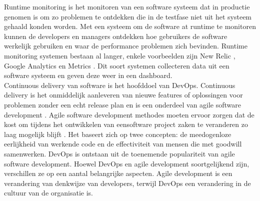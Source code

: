 Runtime monitoring is het monitoren van een software systeem dat in productie genomen is om zo problemen te ontdekken die in de testfase niet uit het systeem gehaald konden worden. Met een systeem om de software at runtime te monitoren kunnen de developers en managers ontdekken hoe gebruikers de software werkelijk gebruiken en waar de performance problemen zich bevinden. Runtime monitoring systemen bestaan al langer, enkele voorbeelden zijn New Relic \cite{NewRelic}, Google Analytics \cite{GooAna} en Metrics \cite{Metrics}. Dit soort systemen collecteren data uit een software systeem en geven deze weer in een dashboard. \\

Continuous delivery van software is het hoofddoel van DevOps. Continuous delivery is het onmiddelijk aanleveren van nieuwe features of oplossingen voor problemen zonder een echt release plan en is een onderdeel van agile software development \cite{beck2001manifesto} \cite{fowler2001agile}. Agile software development methodes moeten ervoor zorgen dat de kost om tijdens het ontwikkelen van eensoftware project zaken te veranderen zo laag mogelijk blijft \cite{highsmith2001agile}. Het baseert zich op twee concepten: de meedogenloze eerlijkheid van werkende code en de effectiviteit van mensen die met goodwill samenwerken. DevOps is ontstaan uit de toenemende populariteit van agile software development. Hoewel DevOps en agile development soortgelijkend zijn, verschillen ze op een aantal belangrijke aspecten. Agile development is een verandering van denkwijze van developers, terwijl DevOps een verandering in de cultuur van de organisatie is. \\

